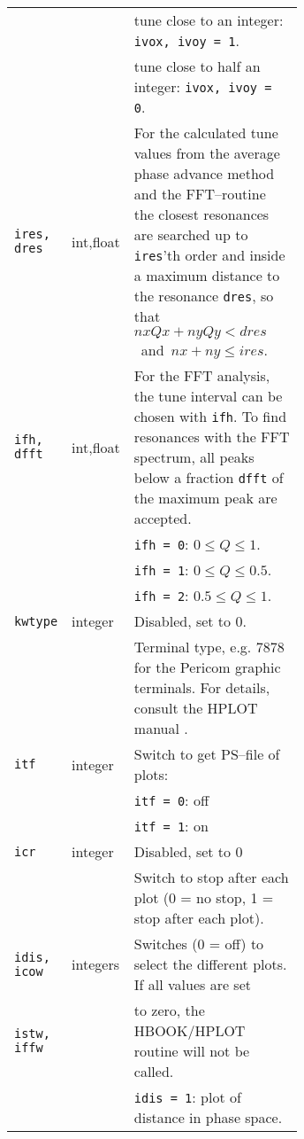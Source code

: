 \begin{longtabu}{@{}llp{0.65\linewidth}}
                          &          & tune close to an integer: \texttt{ivox, ivoy = 1}. \\
                          &          & tune close to half an integer: \texttt{ivox, ivoy = 0}. \\
    \texttt{ires, dres}   & int,float& For the calculated tune values from the average phase advance method and the FFT--routine the closest resonances are searched up to \texttt{ires}'th order and inside a maximum distance to the resonance \texttt{dres}, so that \mbox{$nx Qx + ny Qy < dres $ and $ nx + ny \le ires $.} \\
    \texttt{ifh, dfft}    & int,float& For the FFT analysis, the tune interval can be chosen with \texttt{ifh}. To find resonances with the FFT spectrum, all peaks below a fraction \texttt{dfft} of the maximum peak are accepted. \\
                          &          & \texttt{ifh = 0}: $0 \le Q \le 1$. \\
                          &          & \texttt{ifh = 1}: $0 \le Q \le 0.5$. \\
                          &          & \texttt{ifh = 2}: $0.5 \le Q \le 1$. \\
    \texttt{kwtype}       & integer  & \textcolor{notered}{Disabled, set to 0.} \\
                          &          & Terminal type, e.g. 7878 for the Pericom graphic terminals. For details, consult the HPLOT manual \cite{HPLOT}. \\
    \texttt{itf}          & integer  & Switch to get PS--file of plots: \\
                          &          & \texttt{itf = 0}: off \\
                          &          & \texttt{itf = 1}: on \\
    \texttt{icr}          & integer  & \textcolor{notered}{Disabled, set to 0} \\
                          &          & Switch to stop after each plot (0 = no stop, 1 = stop after each plot). \\
    \texttt{idis, icow}   & integers & Switches (0 = off) to select the different plots. If all values are set \\
    \texttt{istw, iffw}   &          & to zero, the HBOOK/HPLOT routine will not be called. \\
                          &          & \texttt{idis = 1}: plot of distance in phase space. \\

\end{longtabu}
